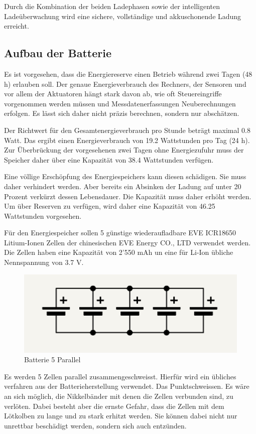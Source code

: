 Durch die Kombination der beiden Ladephasen sowie der intelligenten Ladeüberwachung wird eine sichere, vollständige und akkuschonende Ladung erreicht.


\subsection{Aufbau der Batterie}
Es ist vorgesehen, dass die Energiereserve einen Betrieb während zwei Tagen (48 h) erlauben soll. Der genaue Energieverbrauch des Rechners, der Sensoren und vor allem der Aktuatoren hängt stark davon ab, wie oft Steuereingriffe vorgenommen werden müssen und Messdatenerfassungen Neuberechnungen erfolgen. Es lässt sich daher nicht präzis berechnen, sondern nur abschätzen. 

Der Richtwert für den Gesamtenergieverbrauch pro Stunde beträgt maximal 0.8 Watt. Das ergibt einen Energieverbrauch von 19.2 Wattstunden pro Tag (24 h). Zur Überbrückung der vorgesehenen zwei Tagen ohne Energiezufuhr muss der Speicher daher über eine Kapazität von 38.4 Wattstunden verfügen. 

Eine völlige Erschöpfung des Energiespeichers kann diesen schädigen. Sie muss daher verhindert werden. Aber bereits ein Absinken der Ladung auf unter 20 Prozent verkürzt dessen Lebensdauer. Die Kapazität muss daher erhöht werden. Um über Reserven zu verfügen, wird daher eine Kapazität von 46.25 Wattstunden vorgesehen.

Für den Energiespeicher sollen 5 günstige wiederaufladbare EVE ICR18650 Litium-Ionen Zellen der chinesischen EVE Energy CO., LTD verwendet werden. Die Zellen haben eine Kapazität von 2'550 mAh un eine für Li-Ion übliche Nennspannung von 3.7 V.

\begin{figure}[H]
    \centering
    \includegraphics[width=0.5\linewidth]{assets/batterie_5p.png}
    \caption{Batterie 5 Parallel}
    \label{fig:bat5p}
\end{figure}

Es werden 5 Zellen parallel zusammengeschweisst. Hierfür wird ein übliches verfahren aus der Batterieherstellung verwendet. Das Punktschweissen. Es wäre an sich möglich, die Nikkelbänder mit denen die Zellen verbunden sind, zu verlöten. Dabei besteht aber die ernste Gefahr, dass die Zellen mit dem Lötkolben zu lange und zu stark erhitzt werden. Sie können dabei nicht nur unrettbar beschädigt werden, sondern sich auch entzünden.


